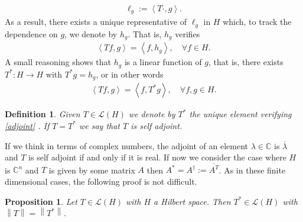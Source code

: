 \documentclass[12pt]{article}
\newtheorem{proposition}{Proposition}
\newtheorem{definition}{Definition}
\newcommand{\U}{_}\renewcommand{\star}{*}
\begin{document}
\begin{CJK*}{UTF8}{gbsn}
	\begin{align}
		\ell\U g := \left\langle T\cdot ,g\right\rangle.
	\end{align}
	As a result, there exists a unique representative of
	$\ell \U g$ in $H$ which, to track the dependence on $g$, we denote by
	$h\U g$. That is, $h\U g$ verifies
	\begin{align}
		\left\langle T f,g\right\rangle= \left\langle f,h\U g\right\rangle, \quad\forall f \in H.
	\end{align}
	A small reasoning shows that $h\U g$ is a linear
	function of $g$, that is, there exists $T^\star :H \to H$ with $T^\star  g=h\U g$,
	or in other words
	\begin{align}\label{adjoint}
		\left\langle Tf,g\right\rangle=\left\langle f, T^\star g\right\rangle , \quad\forall f,g \in  H.
	\end{align}
	\begin{definition}
		Given $T \in \mathcal{L}(H)$ we denote by $T^\star $ the
		unique element  verifying
		\eqref{adjoint} . If
		$T=T^\star $ we say that $T$ is self adjoint.
	\end{definition}
	If we think in terms of complex numbers, the adjoint of an element
	$\lambda  \in \mathbb{C}$ is $\overline{\lambda }$ and $T$ is self
	adjoint if and only if it is real. If now we consider the case where $H$
	is $\mathbb{C}^n$ and $T$ is given by some matrix $A$ then
	$A^\star =A^\dagger:= \overline{A^T}$. As in these finite dimensional cases,
	the following proof is not difficult.
	\begin{proposition} Let $T \in \mathcal{L}(H)$ with $H$ a Hilbert space.
		Then $T^\star  \in \mathcal{L}(H)$ with
		$\left\lVert T \right\rVert=\left\lVert T^\star  \right\rVert$.
	\end{proposition}


\end{CJK*}
\end{document}
